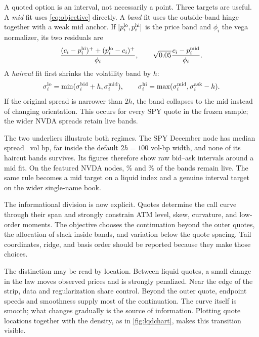 A quoted option is an interval, not necessarily a point.  Three targets are
useful.  A \emph{mid} fit uses \eqref{eq:objective} directly.  A \emph{band}
fit uses the outside-band hinge together with a weak mid anchor.  If
$[p_i^{\rm lo},p_i^{\rm hi}]$ is the price band and $\phi_i$ the vega
normalizer, its two residuals are
\begin{equation}
\frac{(c_i-p_i^{\rm hi})^++(p_i^{\rm lo}-c_i)^+}{\phi_i},
\qquad
\sqrt{0.05}\frac{c_i-p_i^{\rm mid}}{\phi_i}.
\label{eq:band}
\end{equation}
A \emph{haircut} fit first shrinks the volatility band by $h$:
\begin{equation}
\sigma_i^{\rm lo}=\min(\sigma_i^{\rm bid}+h,\sigma_i^{\rm mid}),
\qquad
\sigma_i^{\rm hi}=\max(\sigma_i^{\rm mid},\sigma_i^{\rm ask}-h).
\label{eq:haircut}
\end{equation}
If the original spread is narrower than $2h$, the band collapses to the mid
instead of changing orientation.  This occurs for every SPY quote in the
frozen sample; the wider NVDA spreads retain live bands.

The two underliers illustrate both regimes.  The SPY December node has median
spread \MacSpyDecMedianSpreadBp\ vol bp, far inside the default
$2h=100$ vol-bp width, and none of its haircut bands survives.  Its figures
therefore show raw bid--ask intervals around a mid fit.  On the featured NVDA
nodes, \MacNvdaOneDayBandLivePct\% and \MacNvdaLongBandLivePct\% of the
bands remain live.  The same rule becomes a mid target on a liquid index and a
genuine interval target on the wider single-name book.

The informational division is now explicit.  Quotes determine the call curve
through their span and strongly constrain ATM level, skew, curvature, and
low-order moments.  The objective chooses the continuation beyond the outer
quotes, the allocation of slack inside bands, and variation below the quote
spacing.  Tail coordinates, ridge, and basis order should be reported because
they make those choices.

The distinction may be read by location.  Between liquid quotes, a small
change in the law moves observed prices and is strongly penalized.  Near the
edge of the strip, data and regularization share control.  Beyond the outer
quote, endpoint speeds and smoothness supply most of the continuation.  The
curve itself is smooth; what changes gradually is the source of information.
Plotting quote locations together with the density, as in
\cref{fig:lqdchart}, makes this transition visible.

